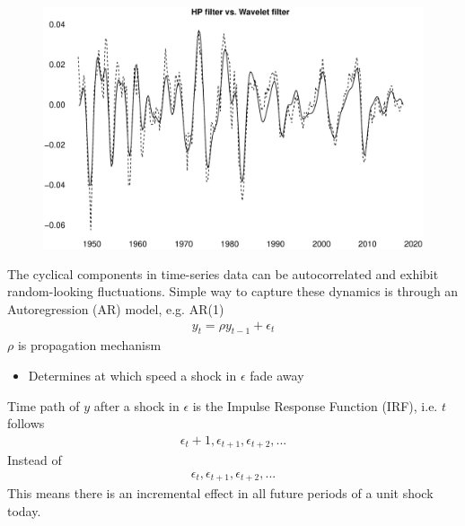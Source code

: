 \documentclass{beamer}
\begin{document}
\begin{frame}
  \begin{figure}
    \includegraphics[scale=.3]{wavelet.eps}
  \end{figure}
\end{frame}



\begin{frame}
  The cyclical components in time-series data can be autocorrelated and exhibit random-looking fluctuations.
  Simple way to capture these dynamics is through an Autoregression (AR) model, e.g. AR(1)
  \begin{align}
     y_t = \rho y_{t-1} + \epsilon_t
   \end{align} 
   \medskip
   $\rho$ is propagation mechanism
   \begin{itemize}
      \item Determines at which speed a shock in $\epsilon$ fade away
    \end{itemize} 
\end{frame}

\begin{frame}
  Time path of $y$ after a shock in $\epsilon$ is the Impulse Response Function (IRF), i.e. $t$ follows
  \begin{align}
    \epsilon_t + 1, \epsilon_{t+1}, \epsilon_{t+2},...
  \end{align}
  Instead of 
  \begin{align}
    \epsilon_t , \epsilon_{t+1}, \epsilon_{t+2},...
  \end{align}
  \medskip
  This means there is an incremental effect in all future periods of a unit shock today.  
\end{frame}
\end{document}
